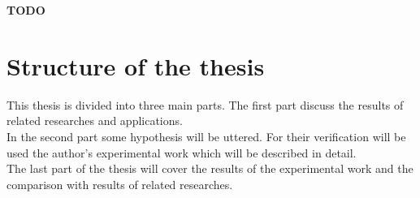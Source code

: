 \textbf{TODO}

\section{Structure of the thesis}

This thesis is divided into three main parts. The first part discuss the results of related researches and applications.\\

In the second part some hypothesis will be uttered. For their verification will be used the author’s experimental work which will be described in detail.\\

The last part of the thesis will cover the results of the experimental work and the comparison with results of related researches.


